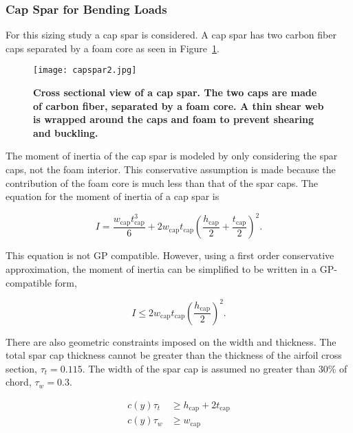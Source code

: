 \documentclass[]{aiaa-tc}%
\begin{document}
\subsubsection{Cap Spar for Bending Loads}

For this sizing study a cap spar is considered.  A cap spar has two carbon fiber caps separated by a foam core as seen in Figure~\ref{f:capspar}.

\begin{figure}[H]
	\begin{center}
	\texttt{[image: capspar2.jpg]}
    \caption{\textbf{Cross sectional view of a cap spar.  The two caps are made of carbon fiber, separated by a foam core. A thin shear web is wrapped around the caps and foam to prevent shearing and buckling.}}
	\label{f:capspar}
	\end{center}
\end{figure}

The moment of inertia of the cap spar is modeled by only considering the spar caps, not the foam interior.  
This conservative assumption is made because the contribution of the foam core is much less than that of the spar caps.  
The equation for the moment of inertia\cite{bending} of a cap spar is 

\begin{equation}
    \label{e:moispar}
    I = \frac{w_{\text{cap}}t_{\text{cap}}^3}{6} + 2w_{\text{cap}}t_{\text{cap}}\left( \frac{h_{\text{cap}}}{2} + \frac{t_{\text{cap}}}{2} \right)^2.
\end{equation}

This equation is not GP compatible.  However, using a first order conservative approximation, the moment of inertia can be simplified to be written in a GP-compatible form, 

\begin{equation}
    \label{e:moispar}
    I \leq 2w_{\text{cap}}t_{\text{cap}}\left(\frac{h_{\text{cap}}}{2}\right)^2.
\end{equation}

There are also geometric constraints imposed on the width and thickness.  The total spar cap thickness cannot be greater than the thickness of the airfoil cross section, $\tau_t = 0.115$.  The width of the spar cap is assumed no greater than 30\% of chord, $\tau_w = 0.3$.

\begin{align}
    \label{e:thickness}
    c(y)\tau_t &\geq h_{\text{cap}} + 2t_{\text{cap}} \\
    \label{e:width}
    c(y)\tau_w &\geq w_{\text{cap}} 
    \end{align}
\end{document}
